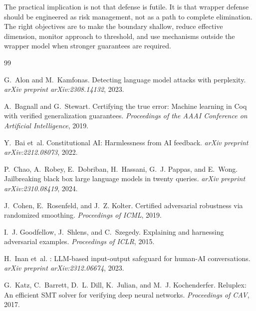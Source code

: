 \documentclass[11pt]{article}
\begin{document}
The practical implication is not that defense is futile. It is that
wrapper defense should be engineered as risk management, not as a path
to complete elimination. The right objectives are to make the boundary
shallow, reduce effective dimension, monitor approach to threshold, and
use mechanisms outside the wrapper model when stronger guarantees are
required.






\begin{thebibliography}{99}

G.~Alon and M.~Kamfonas.
\newblock Detecting language model attacks with perplexity.
\newblock \emph{arXiv preprint arXiv:2308.14132}, 2023.

A.~Bagnall and G.~Stewart.
\newblock Certifying the true error: Machine learning in {Coq} with
  verified generalization guarantees.
\newblock \emph{Proceedings of the AAAI Conference on Artificial
Intelligence}, 2019.

Y.~Bai et~al.
\newblock Constitutional {AI}: Harmlessness from {AI} feedback.
\newblock \emph{arXiv preprint arXiv:2212.08073}, 2022.

P.~Chao, A.~Robey, E.~Dobriban, H.~Hassani, G.~J. Pappas, and
E.~Wong.
\newblock Jailbreaking black box large language models in twenty queries.
\newblock \emph{arXiv preprint arXiv:2310.08419}, 2024.

J.~Cohen, E.~Rosenfeld, and J.~Z. Kolter.
\newblock Certified adversarial robustness via randomized smoothing.
\newblock \emph{Proceedings of ICML}, 2019.

I.~J. Goodfellow, J.~Shlens, and C.~Szegedy.
\newblock Explaining and harnessing adversarial examples.
\newblock \emph{Proceedings of ICLR}, 2015.

H.~Inan et~al.
: {LLM}-based input-output safeguard for
  human-{AI} conversations.
\newblock \emph{arXiv preprint arXiv:2312.06674}, 2023.

G.~Katz, C.~Barrett, D.~L. Dill, K.~Julian, and
M.~J. Kochenderfer.
\newblock Reluplex: An efficient {SMT} solver for verifying deep neural
  networks.
\newblock \emph{Proceedings of CAV}, 2017.


\end{thebibliography}
\end{document}
